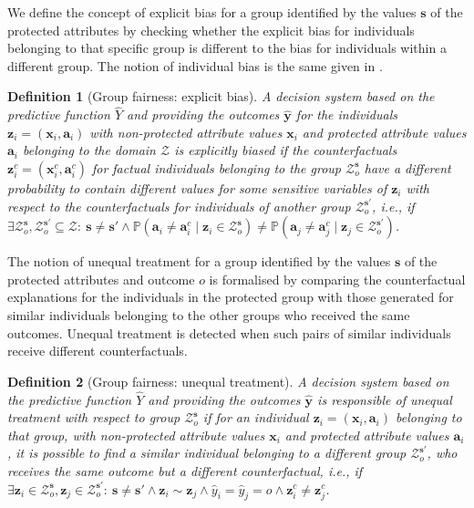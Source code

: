 \documentclass[letterpaper]{article} %
\newtheorem{definition}{Definition}
\begin{document}
We define the concept of explicit bias for a group identified by the values $\boldsymbol{s}$ of the protected attributes by checking whether the explicit bias for individuals belonging to that specific group is different to the bias for individuals within a different group.
%
The notion of individual bias is the same given in .
%
\begin{definition}[Group fairness: explicit bias]\label{explicit_bias_group}
	A decision system based on the predictive function $\hat{Y}$ and providing the outcomes $\boldsymbol{\hat{y}}$ for the individuals $\boldsymbol{z}_i = (\boldsymbol{x}_i, \boldsymbol{a}_i)$ with non-protected attribute values $\boldsymbol{x}_{i}$ and protected attribute values $\boldsymbol{a}_{i}$ belonging to the domain $\mathcal{Z}$ is \emph{explicitly biased} if the counterfactuals $\boldsymbol{z}_i^c = (\boldsymbol{x}_i^c, \boldsymbol{a}_i^c)$ for factual individuals belonging to the group $\mathcal{Z}^{\boldsymbol{s}}_o$ have a different probability to contain different values for some sensitive variables of $\boldsymbol{z}_i$ with respect to the counterfactuals for individuals of another group $\mathcal{Z}^{\boldsymbol{s}'}_o$, i.e., if $\exists \mathcal{Z}^{\boldsymbol{s}}_o, \mathcal{Z}^{\boldsymbol{s}'}_o \subseteq \mathcal{Z} : ~ \boldsymbol{s} \neq \boldsymbol{s}' \wedge \mathbb{P}(\boldsymbol{a}_{i} \neq \boldsymbol{a}_{i}^{c} \mid \boldsymbol{z}_i \in \mathcal{Z}^{\boldsymbol{s}}_o) \neq \mathbb{P}(\boldsymbol{a}_{j} \neq \boldsymbol{a}_{j}^{c} \mid \boldsymbol{z}_j \in \mathcal{Z}^{\boldsymbol{s}'}_o)$.
\end{definition}

The notion of unequal treatment for a group identified by the values $\boldsymbol{s}$ of the protected attributes and outcome $o$ is formalised by comparing the counterfactual explanations for the individuals in the protected group with those generated for similar individuals belonging to the other groups who received the same outcomes.
%
Unequal treatment is detected when such pairs of similar individuals receive different counterfactuals.
%
\begin{definition}[Group fairness: unequal treatment]\label{unequal_treatment_group}
	A decision system based on the predictive function $\hat{Y}$ and providing the outcomes $\boldsymbol{\hat{y}}$ is responsible of \emph{unequal treatment} with respect to group $\mathcal{Z}^{\boldsymbol{s}}_o$ if for an individual $\boldsymbol{z}_i = (\boldsymbol{x}_i, \boldsymbol{a}_i)$ belonging to that group, with non-protected attribute values $\boldsymbol{x}_i$ and protected attribute values $\boldsymbol{a}_i$, it is possible to find a similar individual belonging to a different group $\mathcal{Z}^{\boldsymbol{s}'}_o$, who receives the same outcome but a different counterfactual, i.e., if $\exists \boldsymbol{z}_i \in \mathcal{Z}^{\boldsymbol{s}}_o, \boldsymbol{z}_j \in \mathcal{Z}^{\boldsymbol{s}'}_o : ~ \boldsymbol{s} \neq \boldsymbol{s}' \wedge \boldsymbol{z}_i \sim \boldsymbol{z}_j \wedge \hat{y}_i = \hat{y}_j = o \wedge \boldsymbol{z}_i^c \neq \boldsymbol{z}_j^c$.
\end{definition}
\end{document}
